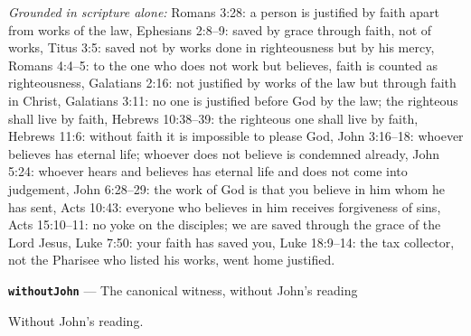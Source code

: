 \documentclass[11pt,paper=\testimonypaper,DIV=13,parskip=false]{scrartcl}
\begin{document}
\emph{Grounded in scripture alone:} Romans 3:28: a person is justified by faith apart from works of the law, Ephesians 2:8–9: saved by grace through faith, not of works, Titus 3:5: saved not by works done in righteousness but by his mercy, Romans 4:4–5: to the one who does not work but believes, faith is counted as righteousness, Galatians 2:16: not justified by works of the law but through faith in Christ, Galatians 3:11: no one is justified before God by the law; the righteous shall live by faith, Hebrews 10:38–39: the righteous one shall live by faith, Hebrews 11:6: without faith it is impossible to please God, John 3:16–18: whoever believes has eternal life; whoever does not believe is condemned already, John 5:24: whoever hears and believes has eternal life and does not come into judgement, John 6:28–29: the work of God is that you believe in him whom he has sent, Acts 10:43: everyone who believes in him receives forgiveness of sins, Acts 15:10–11: no yoke on the disciples; we are saved through the grace of the Lord Jesus, Luke 7:50: your faith has saved you, Luke 18:9–14: the tax collector, not the Pharisee who listed his works, went home justified.
\par\medskip\noindent\textbf{\texttt{without\allowbreak{}John}} --- The canonical witness, without John’s reading\par\nobreak\noindent
Without John’s reading.
\end{document}

